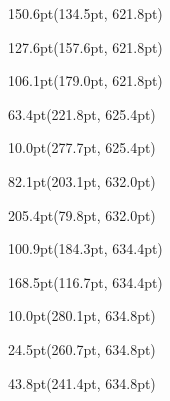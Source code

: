 \documentclass{article}
\begin{document}
\begin{textblock*}{150.6pt}(134.5pt, 621.8pt)%
\noindent%
%
\end{textblock*}
\begin{textblock*}{127.6pt}(157.6pt, 621.8pt)%
\noindent%
%
\end{textblock*}
\begin{textblock*}{106.1pt}(179.0pt, 621.8pt)%
\noindent%
%
\end{textblock*}
\begin{textblock*}{63.4pt}(221.8pt, 625.4pt)%
\noindent%
%
\end{textblock*}
\begin{textblock*}{10.0pt}(277.7pt, 625.4pt)%
\noindent%
%
\end{textblock*}
\begin{textblock*}{82.1pt}(203.1pt, 632.0pt)%
\noindent%
%
\end{textblock*}
\begin{textblock*}{205.4pt}(79.8pt, 632.0pt)%
\noindent%
%
\end{textblock*}
\begin{textblock*}{100.9pt}(184.3pt, 634.4pt)%
\noindent%
%
\end{textblock*}
\begin{textblock*}{168.5pt}(116.7pt, 634.4pt)%
\noindent%
%
\end{textblock*}
\begin{textblock*}{10.0pt}(280.1pt, 634.8pt)%
\noindent%
%
\end{textblock*}
\begin{textblock*}{24.5pt}(260.7pt, 634.8pt)%
\noindent%
%
\end{textblock*}
\begin{textblock*}{43.8pt}(241.4pt, 634.8pt)%
\noindent%
%
\end{textblock*}
\end{document}
